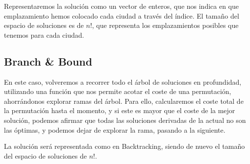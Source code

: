 \documentclass[a4paper, 11pt]{article} %
\begin{document}
	    Representaremos la solución como un vector de enteros, que nos indica en que emplazamiento hemos colocado cada ciudad a 
	    través del índice. El tamaño del espacio de soluciones es de $n!$, que representa los emplazamientos posibles que tenemos 
	    para cada ciudad. 
	  
	  \subsection{Branch \& Bound}
	    En este caso, volveremos a recorrer todo el árbol de soluciones en profundidad, utilizando una función que nos permite acotar el
	    coste de una permutación, ahorrándonos explorar ramas del árbol. Para ello, calcularemos el coste total de la permutación hasta el 
	    momento, y si este es mayor que el coste de la mejor solución, podemos afirmar que todas las soluciones derivadas de la actual no 
	    son las óptimas, y podemos dejar de explorar la rama, pasando a la siguiente. 
	    
	    La solución será representada como en Backtracking, siendo de nuevo el tamaño del espacio de soluciones de $n!$.
	  
        
        
    
\end{document}
